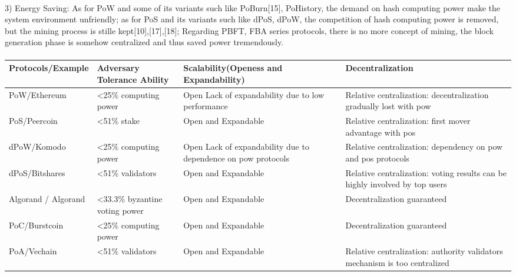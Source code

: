 \documentclass[doublespacing]{bmcart}
\begin{document}
\begin{CJK*}{UTF8}{gbsn}
\paragraph{}
3)  Energy Saving: As for PoW and some of its variants such like PoBurn[15], PoHistory, the demand on hash computing power make the system environment unfriendly; as for PoS and its variants such like dPoS, dPoW, the competition of hash computing power is removed, but the mining process is stille kept[10],[17],[18];
Regarding PBFT, FBA series protocols, there is no more concept of mining, the block generation phase is somehow centralized and thus saved power tremendously.
\paragraph{}
\begin{tabular}{p{2cm}p{3cm}p{3cm}p{3cm}}
\hline
Protocols/E\-xample  & 
Adversary Tolerance Ability & 
Scalability(Openess and Expandability) & Decentralization \\ \hline

PoW/Ethe\-reum  & \textless25\% computing power & Open \newline Lack of expandability due to low performance & Relative centralization:  decentralization gradually lost with pow\\ \hline

PoS/Peercoin & 
\textless51\% stake & 
Open and Expandable & 
Relative centralization: first mover advantage with pos\\ \hline

dPoW/Komo\-do  & 
\textless25\% computing power &
  Open  \newline Lack of expandability due to dependence on pow protocols & 
  Relative centralization: dependency on pow and pos protocols \\ \hline
dPoS/\newline Bitshares  & \textless51\% validators & Open and Expandable & Relative centralization: voting results can be highly involved by top users \\ \hline
Algorand / Algorand & \textless33.3\% byzantine voting power & Open and Expandable & Decentralization guaranteed  \\ \hline
PoC/Burst\-coin &
 \textless25\% computing power &
  Open and Expandable &
  Decentralization guaranteed \\ \hline
  
  PoA/Vechain &
 \textless51\% validators &
  Open and Expandable &
  Relative centralization: authority validators mechanism is too centralized\\ \hline
  \end{tabular}

\end{CJK*}
\end{document}
